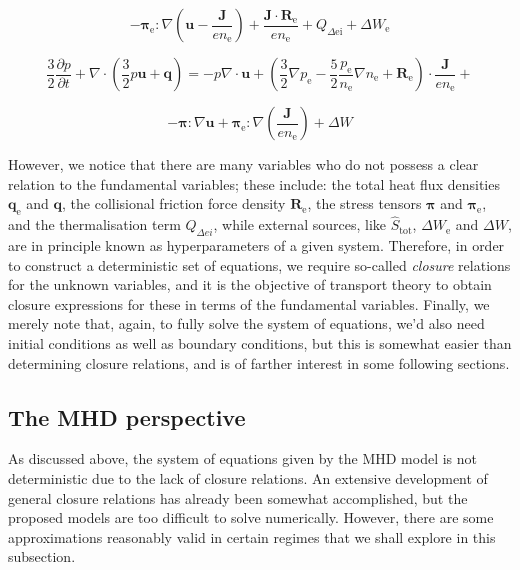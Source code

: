 \begin{equation}
    \label{comp-28}
    -\boldsymbol{\pi}_{\mathrm{e}}:\nabla \left(\mathbf{u}-\frac{\mathbf{J}}{en_{\mathrm{e}}}\right)+\frac{\mathbf{J}\cdot\mathbf{R}_{\mathrm{e}}}{en_{\mathrm{e}}}+Q_{\Delta\mathrm{ei}}+\Delta W_{\mathrm{e}}
\end{equation}

\begin{equation*}
    \frac{3}{2}\frac{\partial p}{\partial t}+\nabla\cdot \left(\frac{3}{2}p \mathbf{u}+\mathbf{q}\right)=-p\nabla\cdot \mathbf{u}+\left(\frac{3}{2}\nabla p_{\mathrm{e}}-\frac{5}{2}\frac{p_{\mathrm{e}}}{n_{\mathrm{e}}}\nabla n_{\mathrm{e}} + \mathbf{R}_{\mathrm{e}}\right)\cdot \frac{\mathbf{J}}{en_{\mathrm{e}}}+
\end{equation*}

\begin{equation}
    \label{comp-29}
    -\boldsymbol{\pi}:\nabla \mathbf{u}+\boldsymbol{\pi}_{\mathrm{e}}:\nabla \left(\frac{\mathbf{J}}{en_{\mathrm{e}}}\right)+\Delta W
\end{equation}

However, we notice that there are many variables who do not possess a clear relation to the fundamental variables; these include: the total heat flux densities $\mathbf{q}_{\mathrm{e}}$ and $\mathbf{q}$, the collisional friction force density $\mathbf{R}_{\mathrm{e}}$, the stress tensors $\boldsymbol{\pi}$ and $\boldsymbol{\pi}_{\mathrm{e}}$, and the thermalisation term $Q_{\Delta ei}$, while external sources, like $\hat{S}_{\mathrm{tot}}$, $\Delta W_{\mathrm{e}}$ and $\Delta W$, are in principle known as hyperparameters of a given system. Therefore, in order to construct a deterministic set of equations, we require so-called \textit{closure} relations for the unknown variables, and it is the objective of transport theory to obtain closure expressions for these in terms of the fundamental variables. Finally, we merely note that, again, to fully solve the system of equations, we'd also need initial conditions as well as boundary conditions, but this is somewhat easier than determining closure relations, and is of farther interest in some following sections.

\subsection{The MHD perspective}

As discussed above, the system of equations given by the MHD model is not deterministic due to the lack of closure relations. An extensive development of general closure relations has already been somewhat accomplished, but the proposed models are too difficult to solve numerically. However, there are some approximations reasonably valid in certain regimes that we shall explore in this subsection.

